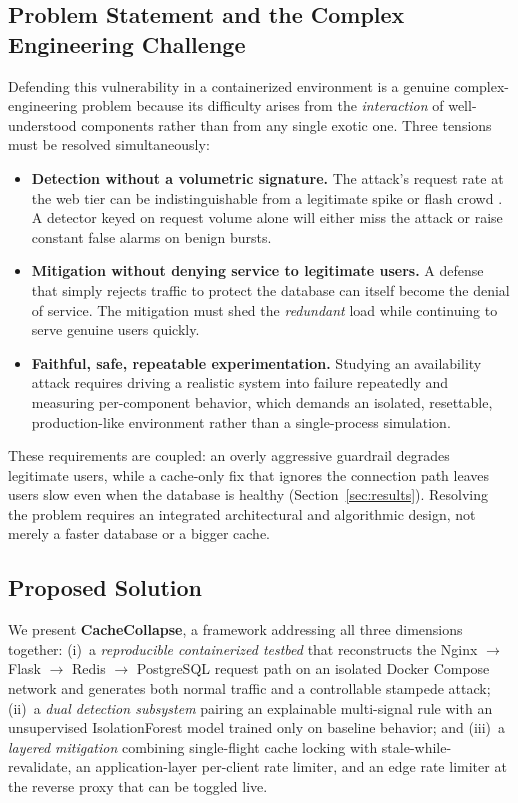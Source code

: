 \documentclass[conference]{IEEEtran}
\begin{document}
\subsection{Problem Statement and the Complex Engineering Challenge}
Defending this vulnerability in a containerized environment is a genuine
complex-engineering problem because its difficulty arises from the \emph{interaction}
of well-understood components rather than from any single exotic one. Three tensions
must be resolved simultaneously:
\begin{itemize}
\item \textbf{Detection without a volumetric signature.} The attack's request rate at
the web tier can be indistinguishable from a legitimate spike or flash crowd
\cite{xie2009}. A detector keyed on request volume alone will either miss the attack
or raise constant false alarms on benign bursts.
\item \textbf{Mitigation without denying service to legitimate users.} A defense that
simply rejects traffic to protect the database can itself become the denial of
service. The mitigation must shed the \emph{redundant} load while continuing to serve
genuine users quickly.
\item \textbf{Faithful, safe, repeatable experimentation.} Studying an availability
attack requires driving a realistic system into failure repeatedly and measuring
per-component behavior, which demands an isolated, resettable, production-like
environment rather than a single-process simulation.
\end{itemize}
These requirements are coupled: an overly aggressive guardrail degrades legitimate
users, while a cache-only fix that ignores the connection path leaves users slow even
when the database is healthy (Section~\ref{sec:results}). Resolving the problem
requires an integrated architectural and algorithmic design, not merely a faster
database or a bigger cache.

\subsection{Proposed Solution}
We present \textbf{CacheCollapse}, a framework addressing all three dimensions
together: (i)~a \emph{reproducible containerized testbed} that reconstructs the
Nginx $\rightarrow$ Flask $\rightarrow$ Redis $\rightarrow$ PostgreSQL request path on
an isolated Docker Compose network and generates both normal traffic and a
controllable stampede attack; (ii)~a \emph{dual detection subsystem} pairing an
explainable multi-signal rule with an unsupervised IsolationForest model trained only
on baseline behavior; and (iii)~a \emph{layered mitigation} combining single-flight
cache locking with stale-while-revalidate, an application-layer per-client rate
limiter, and an edge rate limiter at the reverse proxy that can be toggled live.
\end{document}
